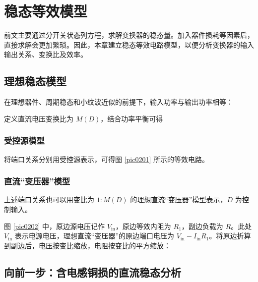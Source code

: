 
\chapter{稳态等效模型}

前文主要通过分开关状态列方程，求解变换器的稳态量。加入器件损耗等因素后，直接求解会更加繁琐。因此，本章建立稳态等效电路模型，以便分析变换器的输入输出关系、变换比及效率。

\section{理想稳态模型}

在理想器件、周期稳态和小纹波近似的前提下，输入功率与输出功率相等：

\vspace{-0.7cm}
\vspace{-0.7cm}

\noindent{}定义直流电压变换比为 $M(D)$，结合功率平衡可得

\vspace{-0.8cm}
\vspace{-1cm}

\subsection{受控源模型}

将端口关系分别用受控源表示，可得图 \ref{pic0201} 所示的等效电路。


\subsection{直流“变压器”模型}

上述端口关系也可以用变比为 $1:M(D)$ 的理想直流“变压器”模型表示，$D$ 为控制输入。

图 \ref{pic0202} 中，原边源电压记作 $V_{\mathrm{in}}$，原边等效内阻为 $R_1$，副边负载为 $R$。此处 $V_{\mathrm{in}}$ 表示电源电压，理想直流“变压器”的原边端口电压为 $V_{\mathrm{in}}-I_{\mathrm{in}}R_1$。将原边折算到副边后，电压按变比缩放，电阻按变比的平方缩放：


\section{向前一步：含电感铜损的直流稳态分析}

